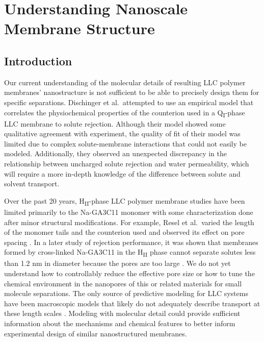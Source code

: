 \chapter{Understanding Nanoscale Membrane Structure}\label{chapter:structure}
  
  \section{Introduction}

  Our current understanding of the molecular details of resulting LLC polymer membranes'
  nanostructure is not sufficient to be able to precisely design them for
  specific separations. Dischinger et al.~attempted to use an empirical model
  that correlates the physiochemical properties of the counterion used in a 
  Q\textsubscript{I}-phase LLC membrane to solute rejection\cite{dischinger_effect_2017}.
  Although their model showed some qualitative agreement with experiment, the
  quality of fit of their model was limited due to complex solute-membrane 
  interactions that could not easily be modeled. Additionally, they observed
  an unexpected discrepancy in the relationship between uncharged solute
  rejection and water permeability, which will require a more in-depth knowledge of
  the difference between solute and solvent transport.
  
  Over the past 20 years, H\textsubscript{II}-phase LLC polymer membrane
  studies have been limited primarily to the Na-GA3C11 monomer with some
  characterization done after minor structural modifications. For example, Resel
  et al.~varied the length of the monomer tails and the counterion used and
  observed its effect on pore spacing \cite{resel_structural_2000}. In a later
  study of rejection performance, it was shown that membranes formed by
  cross-linked Na-GA3C11 in the H\textsubscript{II} phase cannot separate solutes
  less than 1.2 nm in diameter because the pores are too large
  \cite{zhou_supported_2005}. We do not yet understand how to controllably reduce
  the effective pore size or how to tune the chemical environment in the
  nanopores of this or related materials for small molecule separations. The only
  source of predictive modeling for LLC systems have been macroscopic models that
  likely do not adequately describe transport at these length scales
  \cite{hatakeyama_water_2011}. Modeling with molecular detail could provide
  sufficient information about the mechanisms and chemical features to better
  inform experimental design of similar nanostructured membranes. 

